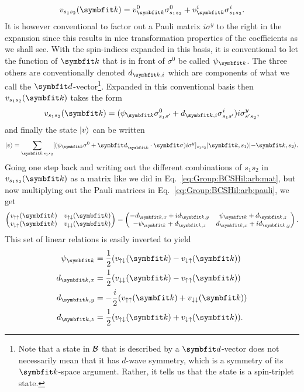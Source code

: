 \begin{equation}
    \label{eq:GroupBCSHil:arb:pauliExp}
    v_{s_1s_2}(\v{k}) = v^0_\v{k}\sigma^0_{s_1s_2} + v^i_\v{k}\sigma^i_{s_1s_2}.
\end{equation}
It is however conventional to factor out a Pauli matrix $i\sigma^y$ to the right in the expansion since this results in nice transformation properties
of the coefficients as we shall see.
With the spin-indices expanded in this basis, it is conventional to let the function of $\v{k}$
that is in front of $\sigma^0$ be called $\psi_\v{k}$. The three others are conventionally denoted $d_{\v{k},i}$ which are components of what we call
the $\v{d}$-vector\footnote{Note that a state in $\mathcal{B}$ that is described by a $\v{d}$-vector does not necessarily mean that it has $d$-wave symmetry,
which is a symmetry of its $\v{k}$-space argument. Rather, it tells us that the state is a spin-triplet state.}. Expanded in this conventional basis
then $v_{s_1s_2}(\v{k})$ takes the form
\begin{equation}
    \label{eq:Group:BCSHil:arb:pauli}
    v_{s_1s_2}(\v{k}) = (\psi_\v{k}\sigma^0_{s_1s'} + d_{\v{k},i}\sigma^i_{s_1s'})i\sigma^y_{s's_2},
\end{equation}
and finally the state $\lvert v \rangle$ can be written
\begin{equation}
    \label{eq:Group:BCSHil:arb:ket}
    \ket{v} = \sum_{\v{k}\,s_1s_2}[(\psi_\v{k}\sigma^0 + \v{d}_\v{k}\cdot\v{\sigma})i\sigma^y]_{s_1s_2}\ket{\v{k},s_1}\ket{-\v{k},s_2}.
\end{equation}
Going one step back and writing out the different combinations of $s_1s_2$ in $v_{s_1s_2}(\v{k})$ as a matrix like we did in
Eq.~\eqref{eq:Group:BCSHil:arb:mat}, but now multiplying out the Pauli matrices in Eq.~\eqref{eq:Group:BCSHil:arb:pauli}, we get
\begin{equation}
    \label{eq:Group:BCSHil:arb:mat:Pauli}
    \begin{pmatrix}
        v_{\up\up}(\v{k}) & v_{\up\dn}(\v{k})\\
        v_{\dn\up}(\v{k}) & v_{\dn\dn}(\v{k})
    \end{pmatrix} =
    \begin{pmatrix}
        -d_{\v{k},x}+id_{\v{k},y} & \psi_\v{k}+d_{\v{k},z}\\
        -\psi_\v{k}+d_{\v{k},z} & d_{\v{k},x}+id_{\v{k},y}
    \end{pmatrix}.
\end{equation}
This set of linear relations is easily inverted to yield
\begin{align}
    \label{eq:Group:BCSHil:arb:inverseRel:psi}
    \psi_\v{k} &= \frac{1}{2}(v_{\up\dn}(\v{k}) - v_{\dn\up}(\v{k}))\\
    \label{eq:Group:BCSHil:arb:inverseRel:dx}
    d_{\v{k},x} &= \frac{1}{2}(v_{\dn\dn}(\v{k})-v_{\up\up}(\v{k}))\\
    \label{eq:Group:BCSHil:arb:inverseRel:dy}
    d_{\v{k},y} &= -\frac{i}{2}(v_{\up\up}(\v{k})+v_{\dn\dn}(\v{k}))\\
    \label{eq:Group:BCSHil:arb:inverseRel:dz}
    d_{\v{k},z} &= \frac{1}{2}(v_{\up\dn}(\v{k})+v_{\dn\up}(\v{k})).
\end{align}

